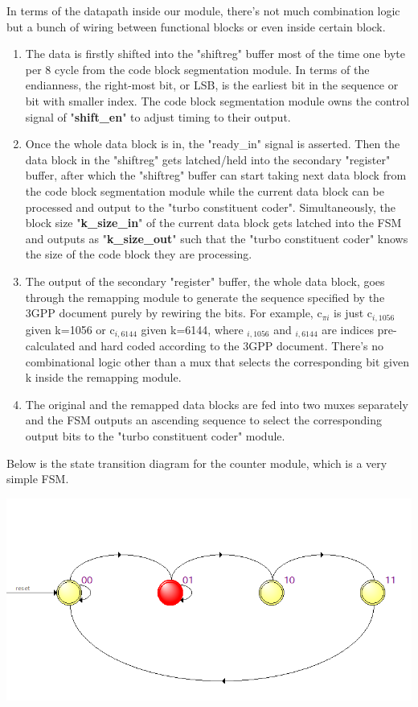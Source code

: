 \documentclass[letterpaper, 12pt]{article} %
\begin{document}
In terms of the datapath inside our module, there's not much combination logic but a bunch of wiring between functional blocks or even inside certain block. 

\begin{enumerate}
    \item The data is firstly shifted into the "shiftreg" buffer most of the time one byte per 8 cycle from the code block segmentation module. In terms of the endianness, the right-most bit, or LSB, is the earliest bit in the sequence or bit with smaller index. The code block segmentation module owns the control signal of "{\bf shift\_en}" to adjust timing to their output.
    \item Once the whole data block is in, the "ready\_in" signal is asserted. Then the data block in the "shiftreg" gets latched/held into the secondary "register" buffer, after which the "shiftreg" buffer can start taking next data block from the code block segmentation module while the current data block can be processed and output to the "turbo constituent coder". Simultaneously, the block size "{\bf k\_size\_in}" of the current data block gets latched into the FSM and outputs as "{\bf k\_size\_out}" such that the "turbo constituent coder" knows the size of the code block they are processing.
    \item The output of the secondary "register" buffer, the whole data block, goes through the remapping module to generate the sequence specified by the 3GPP document purely by rewiring the bits. For example, c$_{\pi i}$ is just c$_{i,1056}$ given k=1056 or c$_{i,6144}$ given k=6144, where $_{i,1056}$ and $_{i,6144}$ are indices pre-calculated and hard coded according to the 3GPP document. There's no combinational logic other than a mux that selects the corresponding bit given k inside the remapping module.
    \item The original and the remapped data blocks are fed into two muxes separately and the FSM outputs an ascending sequence to select the corresponding output bits to the "turbo constituent coder" module.
\end{enumerate}

Below is the state transition diagram for the counter module, which is a very simple FSM.

\begin{center}
    \includegraphics[width=14cm, angle=0]{files/states}
\end{center}
\end{document}
